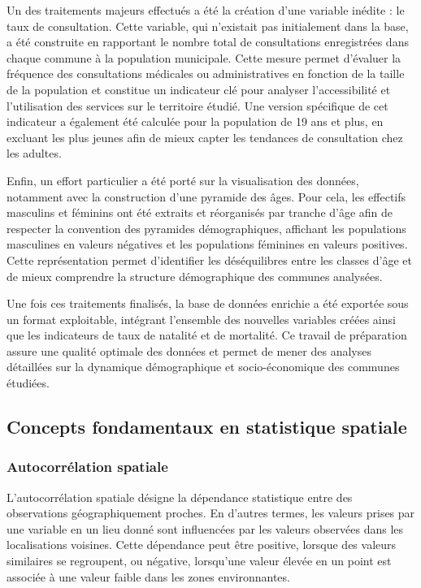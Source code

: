 \documentclass[
]{article}
\begin{document}
Un des traitements majeurs effectués a été la création d'une variable
inédite : le taux de consultation. Cette variable, qui n'existait pas
initialement dans la base, a été construite en rapportant le nombre
total de consultations enregistrées dans chaque commune à la population
municipale. Cette mesure permet d'évaluer la fréquence des consultations
médicales ou administratives en fonction de la taille de la population
et constitue un indicateur clé pour analyser l'accessibilité et
l'utilisation des services sur le territoire étudié. Une version
spécifique de cet indicateur a également été calculée pour la population
de 19 ans et plus, en excluant les plus jeunes afin de mieux capter les
tendances de consultation chez les adultes.

Enfin, un effort particulier a été porté sur la visualisation des
données, notamment avec la construction d'une pyramide des âges. Pour
cela, les effectifs masculins et féminins ont été extraits et
réorganisés par tranche d'âge afin de respecter la convention des
pyramides démographiques, affichant les populations masculines en
valeurs négatives et les populations féminines en valeurs positives.
Cette représentation permet d'identifier les déséquilibres entre les
classes d'âge et de mieux comprendre la structure démographique des
communes analysées.

Une fois ces traitements finalisés, la base de données enrichie a été
exportée sous un format exploitable, intégrant l'ensemble des nouvelles
variables créées ainsi que les indicateurs de taux de natalité et de
mortalité. Ce travail de préparation assure une qualité optimale des
données et permet de mener des analyses détaillées sur la dynamique
démographique et socio-économique des communes étudiées.

\subsection{Concepts fondamentaux en statistique
spatiale}\label{concepts-fondamentaux-en-statistique-spatiale}

\subsubsection{Autocorrélation
spatiale}\label{autocorruxe9lation-spatiale}

L'autocorrélation spatiale désigne la dépendance statistique entre des
observations géographiquement proches. En d'autres termes, les valeurs
prises par une variable en un lieu donné sont influencées par les
valeurs observées dans les localisations voisines. Cette dépendance peut
être positive, lorsque des valeurs similaires se regroupent, ou
négative, lorsqu'une valeur élevée en un point est associée à une valeur
faible dans les zones environnantes.
\end{document}
